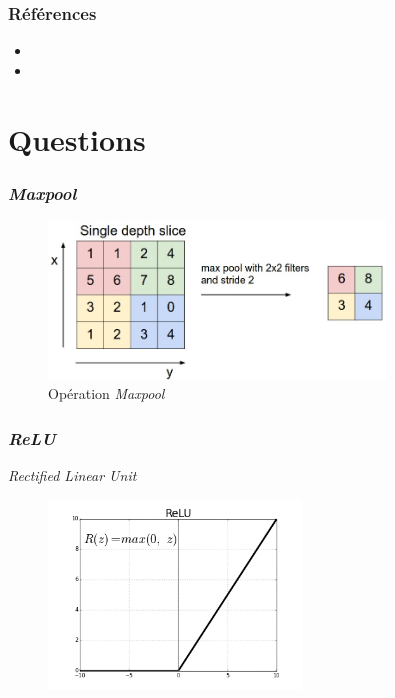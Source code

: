 \documentclass{beamer}
\begin{document}
\begin{frame}
  \frametitle{Références}
  \begin{itemize}
  \item {}
  \item {}
  \end{itemize}
\end{frame}

\section{Questions}

\begin{frame}
  \frametitle{\emph{Maxpool}}
  \begin{figure}
    \centering
    \includegraphics[width=0.8\textwidth]{img/maxpool.jpeg}
    \caption{Opération \emph{Maxpool}}
    \label{fig:maxpool}
  \end{figure}
\end{frame}

\begin{frame}
  \frametitle{\emph{ReLU}}
  \emph{Rectified Linear Unit}
  \begin{figure}
    \centering
    \includegraphics[width=0.6\textwidth]{img/relu.png}
  \end{figure}
\end{frame}
\end{document}
